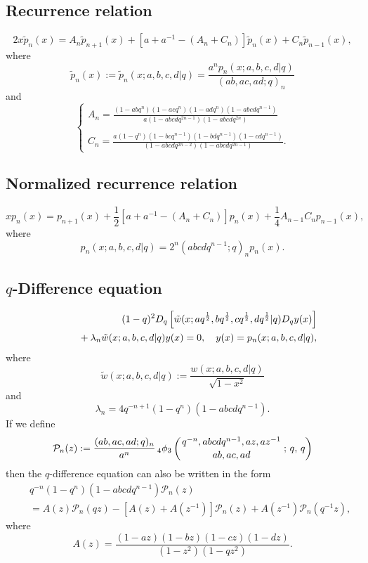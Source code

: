 \documentclass[envcountchap,graybox]{svmono}
\newcommand{\qhyp}[5]{\mbox{}_{#1}{\phi}_{#2}
\left(\genfrac{}{}{0pt}{}{#3}{#4}\,;\,q,\,#5\right)}
\newcommand{\mathindent}{\hspace{7.5mm}}
\newcommand{\qhyp}[5]{\,\mbox{}_{#1}\phi_{#2}\!\left(
  \genfrac{}{}{0pt}{}{#3}{#4};#5\right)}
\begin{document}
\subsection*{Recurrence relation}
\begin{equation}
\label{RecAskeyWilson}
2x{\tilde p}_n(x)=A_n{\tilde p}_{n+1}(x)+\left[a+a^{-1}-\left(A_n+C_n\right)\right]{\tilde p}_n(x)+C_n{\tilde p}_{n-1}(x),
\end{equation}
where
$${\tilde p}_n(x):={\tilde p}_n(x;a,b,c,d|q)=\frac{a^np_n(x;a,b,c,d|q)}{(ab,ac,ad;q)_n}$$
and
$$\left\{\begin{array}{l}
\displaystyle A_n=\frac{(1-abq^n)(1-acq^n)(1-adq^n)(1-abcdq^{n-1})}{a(1-abcdq^{2n-1})(1-abcdq^{2n})}\\
\\
\displaystyle C_n=\frac{a(1-q^n)(1-bcq^{n-1})(1-bdq^{n-1})(1-cdq^{n-1})}{(1-abcdq^{2n-2})(1-abcdq^{2n-1})}.
\end{array}\right.$$

\subsection*{Normalized recurrence relation}
\begin{equation}
\label{NormRecAskeyWilson}
xp_n(x)=p_{n+1}(x)+\frac{1}{2}\left[a+a^{-1}-(A_n+C_n)\right]p_n(x)+
\frac{1}{4}A_{n-1}C_np_{n-1}(x),
\end{equation}
where
$$p_n(x;a,b,c,d|q)=2^n(abcdq^{n-1};q)_np_n(x).$$

\subsection*{$q$-Difference equation}
\begin{eqnarray}
\label{dvAskeyWilson1}
& &(1-q)^2D_q\left[{\tilde w}(x;aq^{\frac{1}{2}},bq^{\frac{1}{2}},
cq^{\frac{1}{2}},dq^{\frac{1}{2}}|q)D_qy(x)\right]\nonumber\\
& &{}\mathindent{}+\lambda_n{\tilde w}(x;a,b,c,d|q)y(x)=0,\quad y(x)=p_n(x;a,b,c,d|q),
\end{eqnarray}
where
$${\tilde w}(x;a,b,c,d|q):=\frac{w(x;a,b,c,d|q)}{\sqrt{1-x^2}}$$
and
$$\lambda_n=4q^{-n+1}(1-q^n)(1-abcdq^{n-1}).$$
If we define
$${\mathcal P}_n(z):=\frac{(ab,ac,ad;q)_n}{a^n}\,\qhyp{4}{3}{q^{-n},abcdq^{n-1},az,az^{-1}}{ab,ac,ad}{q}$$
then the $q$-difference equation can also be written in the form
\begin{eqnarray}
\label{dvAskeyWilson2}
& &q^{-n}(1-q^n)(1-abcdq^{n-1}){\mathcal P}_n(z)\nonumber\\
& &{}=A(z){\mathcal P}_n(qz)-\left[A(z)+A(z^{-1})\right]{\mathcal P}_n(z)+A(z^{-1}){\mathcal P}_n(q^{-1}z),
\end{eqnarray}
where
$$A(z)=\frac{(1-az)(1-bz)(1-cz)(1-dz)}{(1-z^2)(1-qz^2)}.$$
\end{document}
